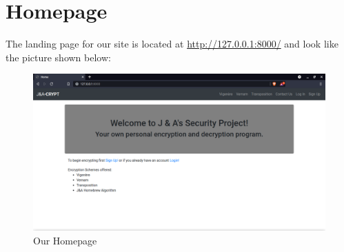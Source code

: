 \documentclass[a4paper, 12pt, titlepage]{report}
\begin{document}
\section{Homepage}
The landing page for our site is located at \url{http://127.0.0.1:8000/} and look like the picture shown below:
\begin{figure}[H]
\centering
\includegraphics[scale=0.35]{./pics/index}
\caption{Our Homepage}
\end{figure}
\end{document}
